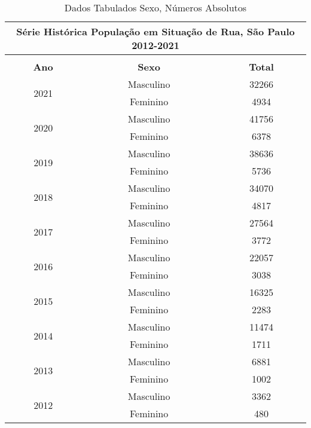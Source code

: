 \documentclass[14pt]{extarticle}
\begin{document}
\begin{table}[htbp]
 \centering
  \caption{Dados Tabulados Sexo, Números Absolutos}
  \tabcolsep=0.15cm
	\renewcommand{\arraystretch}{1.0}
	\begin{adjustbox}{max width=\linewidth}
    \begin{tabular}{ccc}
    \toprule
    \multicolumn{3}{c}{Série Histórica População em Situação de Rua, São Paulo 2012-2021} \\
    \midrule
    \multicolumn{3}{c}{} \\
    \midrule
    \rowcolor[rgb]{ .906,  .902,  .902} \textbf{Ano} & \textbf{Sexo} & \textbf{Total} \\
    \midrule
    \multirow{2}[2]{*}{2021} & Masculino & 32266 \\
          & Feminino & 4934 \\
    \midrule
    \multirow{2}[2]{*}{2020} & Masculino & 41756 \\
          & Feminino & 6378 \\
    \midrule
    \multirow{2}[2]{*}{2019} & Masculino & 38636 \\
          & Feminino & 5736 \\
    \midrule
    \multirow{2}[2]{*}{2018} & Masculino & 34070 \\
          & Feminino & 4817 \\
    \midrule
    \multirow{2}[2]{*}{2017} & Masculino & 27564 \\
          & Feminino & 3772 \\
    \midrule
    \multirow{2}[2]{*}{2016} & Masculino & 22057 \\
          & Feminino & 3038 \\
    \midrule
    \multirow{2}[2]{*}{2015} & Masculino & 16325 \\
          & Feminino & 2283 \\
    \midrule
    \multirow{2}[2]{*}{2014} & Masculino & 11474 \\
          & Feminino & 1711 \\
    \midrule
    \multirow{2}[2]{*}{2013} & Masculino & 6881 \\
          & Feminino & 1002 \\
    \midrule
    \multirow{2}[2]{*}{2012} & Masculino & 3362 \\
          & Feminino & 480 \\
    \bottomrule
    \end{tabular}%
 \end{adjustbox}
  \label{tab:sexo_percentual}%
\end{table}%
\end{document}
